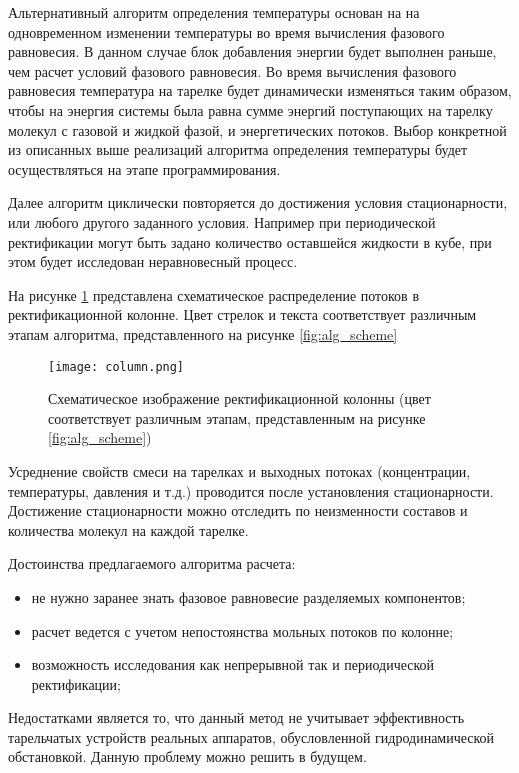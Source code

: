 Альтернативный алгоритм определения температуры основан на на одновременном изменении температуры во время вычисления фазового равновесия. В данном случае блок добавления энергии будет выполнен раньше, чем расчет условий фазового равновесия. Во время вычисления фазового равновесия температура на тарелке будет динамически изменяться таким образом, чтобы на энергия системы была равна сумме энергий поступающих на тарелку молекул с газовой и жидкой фазой, и энергетических потоков. Выбор конкретной из описанных выше  реализаций алгоритма определения температуры будет осуществляться на этапе программирования.
 
Далее алгоритм циклически повторяется до достижения условия стационарности, или любого другого заданного условия. Например при периодической ректификации могут быть задано количество оставшейся жидкости в кубе, при этом будет исследован неравновесный процесс.
 
На рисунке \ref{fig:plate_scheme} представлена схематическое распределение потоков в ректификационной колонне. Цвет стрелок и текста соответствует различным этапам алгоритма, представленного на рисунке \ref{fig:alg_scheme}


\begin{figure}[h]
	\begin{center}
		\texttt{[image: column.png]}
	\end{center}
	\caption{Схематическое изображение ректификационной колонны (цвет соответствует различным этапам, представленным на рисунке \ref{fig:alg_scheme})} \label{fig:plate_scheme}
\end{figure}

Усреднение свойств смеси на тарелках и выходных потоках (концентрации, температуры, давления и т.д.) проводится после установления стационарности. Достижение стационарности можно отследить по неизменности составов и количества молекул на каждой тарелке.

Достоинства предлагаемого алгоритма расчета:
\begin{itemize}
	\item не нужно заранее знать фазовое равновесие разделяемых компонентов;
	\item расчет ведется с учетом непостоянства мольных потоков по колонне;
	\item возможность исследования как непрерывной так и периодической ректификации;
\end{itemize}
Недостатками является то, что данный метод не учитывает эффективность тарельчатых устройств реальных аппаратов, обусловленной гидродинамической обстановкой. Данную проблему можно решить в будущем.


